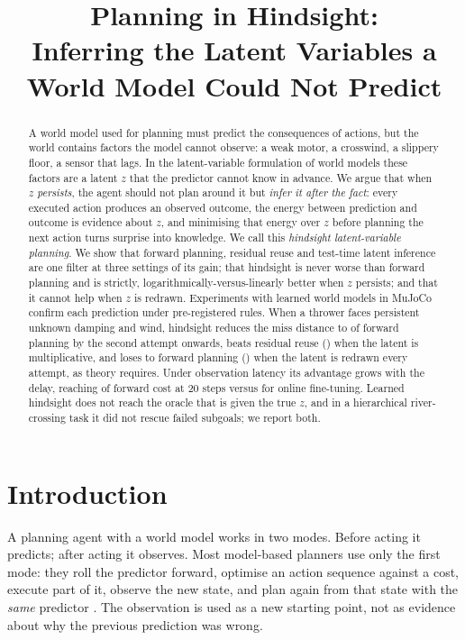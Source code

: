 \documentclass[11pt]{article}
\title{Planning in Hindsight:\\Inferring the Latent Variables a World Model Could Not Predict}
\author{\todo{authors}}
\date{}
\begin{document}
\maketitle

\begin{abstract}
A world model used for planning must predict the consequences of actions, but the world contains factors the model
cannot observe: a weak motor, a crosswind, a slippery floor, a sensor that lags. In the latent-variable formulation of
world models these factors are a latent $z$ that the predictor cannot know in advance. We argue that when $z$
\emph{persists}, the agent should not plan around it but \emph{infer it after the fact}: every executed action produces
an observed outcome, the energy between prediction and outcome is evidence about $z$, and minimising that energy over $z$
before planning the next action turns surprise into knowledge. We call this \emph{hindsight latent-variable planning}.
We show that forward planning, residual reuse and test-time latent inference are one filter at three settings of its
gain; that hindsight is never worse than forward planning and is strictly, logarithmically-versus-linearly better when
$z$ persists; and that it cannot help when $z$ is redrawn. Experiments with learned world models in MuJoCo confirm each
prediction under pre-registered rules. When a thrower faces persistent unknown damping and wind, hindsight reduces the
miss distance to \twHindBoth{} of forward planning by the second attempt onwards, beats residual reuse (\twResidBoth) when
the latent is multiplicative, and loses to forward planning (\twHindFresh) when the latent is redrawn every attempt, as
theory requires. Under observation latency its advantage grows with the delay, reaching \dlPostTwenty{} of forward cost
at 20 steps versus \dlSgdTwenty{} for online fine-tuning. Learned hindsight does not reach the oracle that is given the
true $z$, and in a hierarchical river-crossing task it did not rescue failed subgoals; we report both.
\end{abstract}

\section{Introduction}

A planning agent with a world model works in two modes. Before acting it predicts; after acting it observes. Most
model-based planners use only the first mode: they roll the predictor forward, optimise an action sequence against a
cost, execute part of it, observe the new state, and plan again from that state with the \emph{same} predictor
\citep{chua2018pets,hjepa_2610_06805}. The observation is used as a new starting point, not as evidence about why the
previous prediction was wrong.
\end{document}
